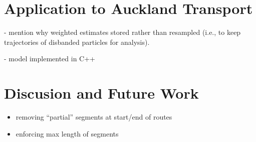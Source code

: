 \documentclass[draftcls,a4paper,onecolumn]{IEEEtran}\usepackage[]{graphicx}\usepackage[]{color}
\begin{document}
\section{Application to Auckland Transport}
\label{sec:results}

- mention why weighted estimates stored rather than resampled 
(i.e., to keep trajectories of disbanded particles for analysis).

- model implemented in C++


\section{Discusion and Future Work}
\label{sec:discussion}

\begin{itemize}
\item removing ``partial'' segments at start/end of routes
\item enforcing max length of segments
\end{itemize}






\end{document}
